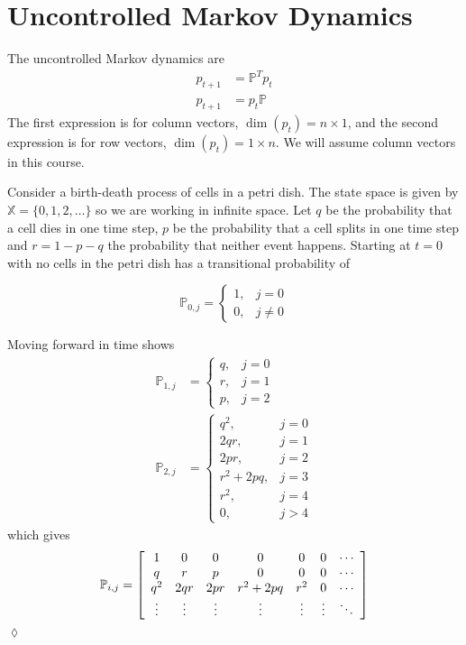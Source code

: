 \section{Uncontrolled Markov Dynamics}
The uncontrolled Markov dynamics are
\begin{align*}
p_{t+1} &= \mathbb{P}^T p_t \\
p_{t+1} &= p_t\mathbb{P}
\end{align*}
The first expression is for column vectors, $\dim(p_t)=n\times 1$, and the second expression is for row vectors, $\dim(p_t)=1\times n$.
We will assume column vectors in this course.

\begin{example}
Consider a birth-death process of cells in a petri dish.
The state space is given by $\mathbb{X}=\{0,1,2,\ldots\}$ so we are working in infinite space.
Let $q$ be the probability that a cell dies in one time step, $p$ be the probability that a cell splits in one time step and $r=1-p-q$ the probability that neither event happens.
Starting at $t=0$ with no cells in the petri dish has a transitional probability of

\begin{equation*}
\mathbb{P}_{0,j} = \begin{cases} 1, & j=0 \\ 0, & j\neq0 \end{cases}
\end{equation*}

Moving forward in time shows
\begin{align*}
\mathbb{P}_{1,j} &= \begin{cases} q, & j=0 \\ r, & j=1 \\ p, & j=2 \end{cases} \\
\mathbb{P}_{2,j} &= \begin{cases} q^2, & j=0 \\ 2qr, & j=1 \\ 2pr, & j=2 \\ r^2+2pq, & j=3 \\ r^2, & j=4 \\ 0, & j>4 \end{cases}
\end{align*}
which gives
\begin{align*}
\mathbb{P}_{i,j} = \left[\begin{array}{c c c c c c c}
1 & 0 & 0 & 0 & 0 & 0 & \cdots \\
q & r & p & 0 & 0 & 0 & \cdots \\
q^2 & 2qr & 2pr & r^2+2pq & r^2 & 0 & \cdots \\
\vdots & \vdots & \vdots & \vdots & \vdots & \vdots & \ddots
\end{array}\right]
\end{align*}
$\lozenge$
\end{example}

